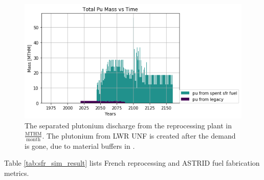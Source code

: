 \begin{figure}[htbp!]
	\begin{center}
		\includegraphics[scale=0.7]{./images/french-transition/pu.png}
	\end{center}
	\caption{The separated plutonium discharge from the reprocessing plant 
        in $\frac{\mbox{MTHM}}{\mbox{month}}$. The plutonium from \gls{LWR} \gls{UNF}
        is created after the demand is gone, due to material buffers in \Cyclus.}
	\label{fig:pu_no_cum}
\end{figure}

 Table \ref{tab:sfr_sim_result} lists French reprocessing and 
 \gls{ASTRID} fuel fabrication metrics.

\begin{table}[h]
	\centering
	\caption {In the French transition to \glspl{SFR},
				  the total legacy \gls{UNF} reprocessed is the 
                                  amount of \gls{UNF} France needs 
				  for a transition into a fully \gls{SFR} fleet. 
                          }
		
		\label{tab:sfr_sim_result}
\end {table}


